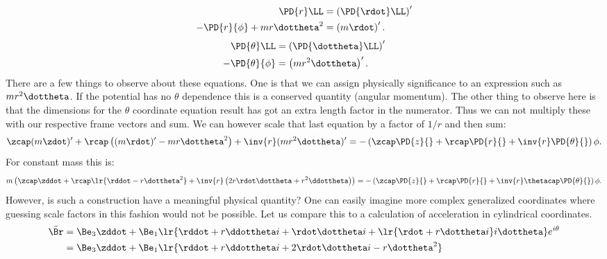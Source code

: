 {\begin{equation}
\begin{aligned}
\PD{r}\LL &= \left(\PD{\rdot}\LL\right)' \\
-\PD{r}{\phi} + m r \dottheta^2 &= \left(m\rdot\right)' .
\end{aligned}
\end{equation}
\begin{equation}\label{eqn:tongMf1:720}
\begin{aligned}
\PD{\theta}\LL &= \left(\PD{\dottheta}\LL\right)' \\
-\PD{\theta}{\phi} &= \left(m r^2 \dottheta\right)' .
\end{aligned}
\end{equation}
%
There are a few things to observe about these equations.  One is that we can assign physically significance to an expression such as \(m r^2 \dottheta\).  If the potential has no \(\theta\) dependence this is a conserved quantity (angular momentum).
%
The other thing to observe here is that the dimensions for the \(\theta\) coordinate equation result has got an extra length factor in the numerator.  Thus we can not multiply these with our respective frame vectors and sum.  We can however scale that last equation by a factor of \(1/r\) and then sum:
%
\begin{equation}\label{eqn:tongMf1:1820}
\zcap (m\zdot)' + \rcap \left((m\rdot)' - m r \dottheta^2\right) + \inv{r} (mr^2 \dottheta)' = - \left(\zcap \PD{z}{} + \rcap \PD{r}{} + \inv{r} \PD{\theta}{}\right) \phi.
\end{equation}
%
For constant mass this is:
\begin{equation}\label{eqn:tongMf1:1840}
m \left( \zcap \zddot + \rcap
\lr{ \rddot - r \dottheta^2 }
 + \inv{r} \left(2 r \rdot \dottheta + r^2 \ddottheta\right) \right) = - \left(\zcap \PD{z}{} + \rcap \PD{r}{} + \inv{r} \thetacap \PD{\theta}{}\right) \phi.
\end{equation}
%
However, is such a construction have a meaningful physical quantity?  One can easily imagine more complex generalized coordinates where guessing scale factors in this fashion would not be possible.
%
Let us compare this to a calculation of acceleration in cylindrical coordinates.
%
\begin{equation}\label{eqn:tongMf1:740}
\begin{aligned}
\ddot{\Br} &= \Be_3 \zddot + \Be_1
\lr{ \rddot + r \ddottheta i + \rdot \dottheta i + \lr{ \rdot + r \dottheta i } i\dottheta }
 e^{i\theta} \\
           &= \Be_3 \zddot + \Be_1
\lr{ \rddot + r \ddottheta i + 2 \rdot \dottheta i - r \dottheta^2 }

\end{aligned}
\end{equation}}
